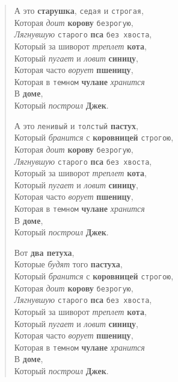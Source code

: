 \begin{verse}
А это \textbf{старушка}, \texttt{седая} и \texttt{строгая}, \\
Которая \textit{доит} \textbf{корову} \texttt{безрогую}, \\
\textit{Лягнувшую} \texttt{старого} \textbf{пса} \texttt{без хвоста}, \\
Который за шиворот \textit{треплет} \textbf{кота}, \\
Который \textit{пугает} и \textit{ловит} \textbf{синицу}, \\
Которая часто \textit{ворует} \textbf{пшеницу}, \\
Которая в \texttt{темном} \textbf{чулане} \textit{хранится} \\
В \textbf{доме}, \\
Который \textit{построил} \textbf{Джек}.

А это \texttt{ленивый} и \texttt{толстый} \textbf{пастух}, \\
Который \textit{бранится} с \textbf{коровницей} \texttt{строгою}, \\
Которая \textit{доит} \textbf{корову} \texttt{безрогую}, \\
\textit{Лягнувшую} \texttt{старого} \textbf{пса} \texttt{без хвоста}, \\
Который за шиворот \textit{треплет} \textbf{кота}, \\
Который \textit{пугает} и \textit{ловит} \textbf{синицу}, \\
Которая часто \textit{ворует} \textbf{пшеницу}, \\
Которая в \texttt{темном} \textbf{чулане} \textit{хранится} \\
В \textbf{доме}, \\
Который \textit{построил} \textbf{Джек}.

Вот \textbf{два петуха}, \\
Которые \textit{будят} того \textbf{пастуха}, \\
Который \textit{бранится} с \textbf{коровницей} \texttt{строгою}, \\
Которая \textit{доит} \textbf{корову} \texttt{безрогую}, \\
\textit{Лягнувшую} \texttt{старого} \textbf{пса} \texttt{без хвоста}, \\
Который за шиворот \textit{треплет} \textbf{кота}, \\
Который \textit{пугает} и \textit{ловит} \textbf{синицу}, \\
Которая часто \textit{ворует} \textbf{пшеницу}, \\
Которая в \texttt{темном} \textbf{чулане} \textit{хранится} \\
В \textbf{доме}, \\
Который \textit{построил} \textbf{Джек}.
\end{verse}

